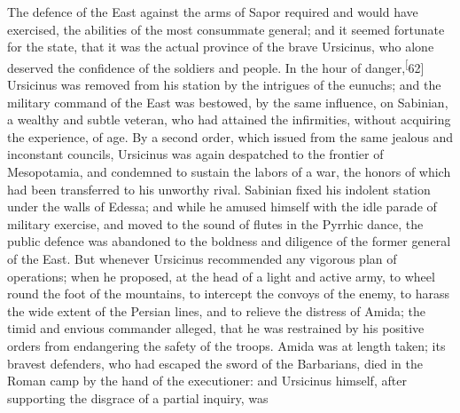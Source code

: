 


The defence of the East against the arms of Sapor required and
would have exercised, the abilities of the most consummate
general; and it seemed fortunate for the state, that it was the
actual province of the brave Ursicinus, who alone deserved the
confidence of the soldiers and people. In the hour of danger,\textsuperscript[62]
Ursicinus was removed from his station by the intrigues of the
eunuchs; and the military command of the East was bestowed, by
the same influence, on Sabinian, a wealthy and subtle veteran,
who had attained the infirmities, without acquiring the
experience, of age. By a second order, which issued from the same
jealous and inconstant councils, Ursicinus was again despatched
to the frontier of Mesopotamia, and condemned to sustain the
labors of a war, the honors of which had been transferred to his
unworthy rival. Sabinian fixed his indolent station under the
walls of Edessa; and while he amused himself with the idle parade
of military exercise, and moved to the sound of flutes in the
Pyrrhic dance, the public defence was abandoned to the boldness
and diligence of the former general of the East. But whenever
Ursicinus recommended any vigorous plan of operations; when he
proposed, at the head of a light and active army, to wheel round
the foot of the mountains, to intercept the convoys of the enemy,
to harass the wide extent of the Persian lines, and to relieve
the distress of Amida; the timid and envious commander alleged,
that he was restrained by his positive orders from endangering
the safety of the troops. Amida was at length taken; its bravest
defenders, who had escaped the sword of the Barbarians, died in
the Roman camp by the hand of the executioner: and Ursicinus
himself, after supporting the disgrace of a partial inquiry, was
